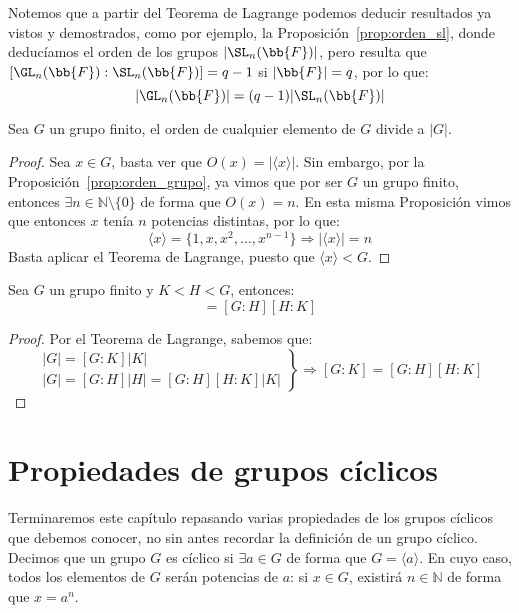 \begin{observacion}
    Notemos que a partir del Teorema de Lagrange podemos deducir resultados ya vistos y demostrados, como por ejemplo, la Proposición~\ref{prop:orden_sl}, donde deducíamos el orden de los grupos $|\SL_n(\bb{F})|$, pero resulta que $[\GL_n(\bb{F}):\SL_n(\bb{F})] = q-1$ si $|\bb{F}| = q$, por lo que:
    \begin{equation*}
        |\GL_n(\bb{F})| = (q-1)|\SL_n(\bb{F})|
    \end{equation*}
\end{observacion}

\begin{coro}
    Sea $G$ un grupo finito, el orden de cualquier elemento de $G$ divide a $|G|$.
    \begin{proof}
        Sea $x\in G$, basta ver que $O(x) = |\langle x \rangle |$. Sin embargo, por la Proposición~\ref{prop:orden_grupo}, ya vimos que por ser $G$ un grupo finito, entonces $\exists n\in \mathbb{N}\setminus\{0\}$ de forma que $O(x) = n$. En esta misma Proposición vimos que entonces $x$ tenía $n$ potencias distintas, por lo que:
        \begin{equation*}
            \langle x \rangle  = \{1,x,x^2,\ldots,x^{n-1}\} \Longrightarrow |\langle x \rangle | = n
        \end{equation*}
        Basta aplicar el Teorema de Lagrange, puesto que $\langle x \rangle < G$.
    \end{proof}
\end{coro}

\begin{coro}
    Sea $G$ un grupo finito y $K < H < G$, entonces:
    \begin{equation*}
        [G:K] = [G:H][H:K]
    \end{equation*}
    \begin{proof}
        Por el Teorema de Lagrange, sabemos que:
        \begin{equation*}
            \left.\begin{array}{r}
                    |G| = [G:K]|K| \\
                    |G| = [G:H]|H| = [G:H][H:K]|K|
            \end{array}\right\} \Longrightarrow [G:K] = [G:H][H:K]
        \end{equation*}
    \end{proof}
\end{coro}

\section{Propiedades de grupos cíclicos}
Terminaremos este capítulo repasando varias propiedades de los grupos cíclicos que debemos conocer, no sin antes recordar la definición de un grupo cíclico. Decimos que un grupo $G$ es cíclico si $\exists a\in G$ de forma que $G = \langle a \rangle $. En cuyo caso, todos los elementos de $G$ serán potencias de $a$: si $x\in G$, existirá $n\in \mathbb{N}$ de forma que $x=a^n$.\\


